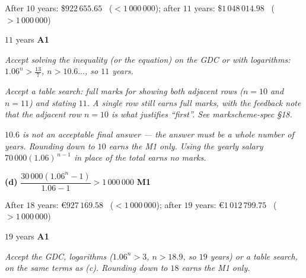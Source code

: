 \documentclass[12pt, twoside]{article}
\begin{document}
\begin{enumerate}[itemsep=0.3cm]
After $10$ years: \$$922\,655.65$ \ ($< 1\,000\,000$); \quad after $11$
years: \$$1\,048\,014.98$ \ ($> 1\,000\,000$)

$11$ years \hfill \textbf{A1}

\emph{Accept solving the inequality (or the equation) on the GDC or with
logarithms: $1.06^{n} > \frac{13}{7}$, $n > 10.6\ldots$, so $11$ years.}

\emph{Accept a table search: full marks for showing both adjacent rows
($n = 10$ and $n = 11$) and stating $11$. A single row still earns full
marks, with the feedback note that the adjacent row $n = 10$ is what
justifies ``first''. See markscheme-spec §18.}

\emph{$10.6$ is not an acceptable final answer --- the answer must be a
whole number of years. Rounding down to $10$ earns the M1 only. Using the
yearly salary $70\,000(1.06)^{\,n-1}$ in place of the total earns no marks.}

\medskip

\textbf{(d)} $\dfrac{30\,000\left(1.06^{n} - 1\right)}{1.06 - 1} > 1\,000\,000$ \hfill \textbf{M1}

After $18$ years: \euro$927\,169.58$ \ ($< 1\,000\,000$); \quad after $19$
years: \euro$1\,012\,799.75$ \ ($> 1\,000\,000$)

$19$ years \hfill \textbf{A1}

\emph{Accept the GDC, logarithms ($1.06^{n} > 3$, $n > 18.9$, so $19$ years)
or a table search, on the same terms as (c). Rounding down to $18$ earns the
M1 only.}

\end{enumerate}
\end{document}
